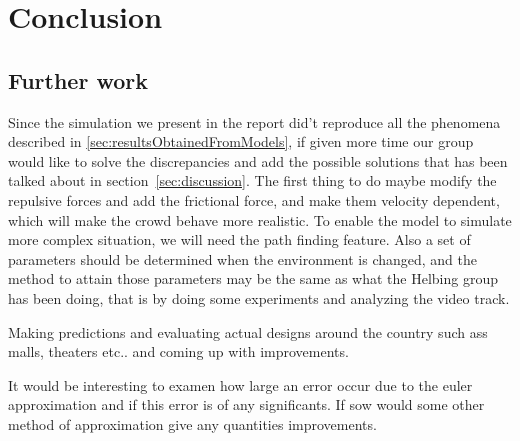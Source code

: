 \section{Conclusion}
\label{sec:conclusion}

\subsection{Further work}
Since the simulation we present in the report did't reproduce all the phenomena described in \ref{sec:resultsObtainedFromModels}, if given more time our group would like to solve the discrepancies and add the possible solutions that has been talked about in section~\ref{sec:discussion}. The first thing to do maybe modify the repulsive
forces and add the frictional force, and make them velocity dependent, which
will make the crowd behave more realistic. To enable the model to simulate
more complex situation, we will need the path finding feature. Also a set of
parameters should be determined when the environment is changed, and the
method to attain those parameters may be the same as what the Helbing group
has been doing, that is by doing some experiments and analyzing the video
track.

Making predictions and evaluating actual designs around the country such ass malls, theaters etc.. and coming up with improvements.

It would be interesting to examen how large an error occur due to the euler approximation and if this error is of any significants. If sow would some other method of approximation give any quantities improvements.


